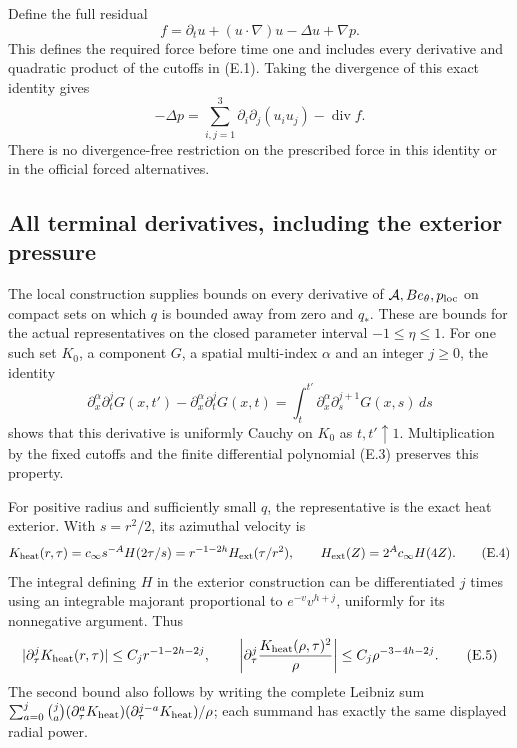 \documentclass[10pt,a4paper]{article}
\begin{document}
Define the full residual
\[
 f=\partial_tu+(u\cdot\nabla)u-\Delta u+\nabla p .
 \tag{E.3}
\]
This defines the required force before time one and includes every
derivative and quadratic product of the cutoffs in (E.1).
Taking the divergence of this exact identity gives
\[
 -\Delta p=\sum_{i,j=1}^3\partial_i\partial_j(u_i u_j)
                   -\operatorname{div}f.
\]
There is no divergence-free restriction on the prescribed force in this
identity or in the official forced alternatives.

\subsection{All terminal derivatives, including the exterior pressure}

The local construction supplies bounds on every derivative of
$\mathcal A,B e_\theta,p_{\rm loc}$ on compact sets on which $q$ is
bounded away from zero and $q_*$. These are bounds for the actual
representatives on the closed parameter interval $-1\le\eta\le1$.
For one such set $K_0$, a component $G$, a spatial multi-index $\alpha$
and an integer $j\ge0$, the identity
\[
 \partial_x^\alpha\partial_t^jG(x,t')
 -\partial_x^\alpha\partial_t^jG(x,t)
 =\int_t^{t'}\partial_x^\alpha\partial_s^{j+1}G(x,s)\,ds
\]
shows that this derivative is uniformly Cauchy on $K_0$ as $t,t'\uparrow1$.
Multiplication by the fixed cutoffs and the finite differential
polynomial (E.3) preserves this property.

For positive radius and sufficiently small $q$, the representative is the
exact heat exterior. With $s=r^2/2$, its azimuthal velocity is
\[
 K_{\rm heat}(r,\tau)=c_\infty s^{-A}H(2\tau/s)
       =r^{-1-2h}H_{\rm ext}(\tau/r^2),
 \qquad H_{\rm ext}(Z)=2^Ac_\infty H(4Z).
 \tag{E.4}
\]
The integral defining $H$ in the exterior construction can be
differentiated $j$ times using an integrable majorant proportional to
$e^{-v}v^{h+j}$, uniformly for its nonnegative argument. Thus
\[
 |\partial_\tau^jK_{\rm heat}(r,\tau)|
       \le C_j r^{-1-2h-2j},\qquad
 \left|\partial_\tau^j
       \frac{K_{\rm heat}(\rho,\tau)^2}{\rho}\right|
       \le C_j\rho^{-3-4h-2j}.
 \tag{E.5}
\]
The second bound also follows by writing the complete Leibniz sum
$\sum_{a=0}^j\binom ja
(\partial_\tau^aK_{\rm heat})(\partial_\tau^{j-a}K_{\rm heat})/\rho$;
each summand has exactly the same displayed radial power.
\end{document}
